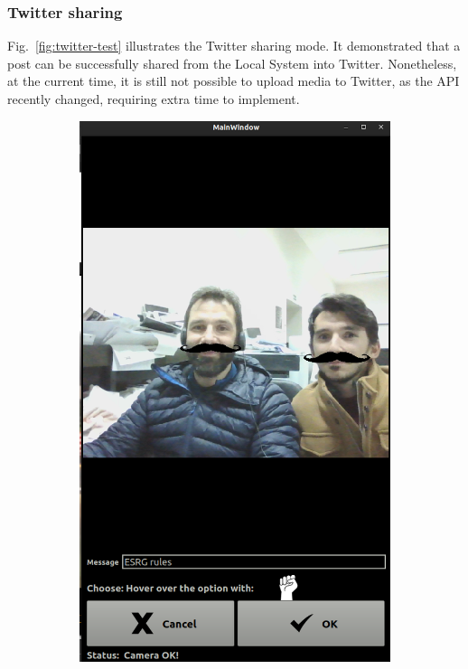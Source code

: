\subsubsection{Twitter sharing}
\label{sec:twitter-sharing}
Fig.~\ref{fig:twitter-test} illustrates the Twitter sharing mode. It
demonstrated that a post can be successfully shared from the Local System into
Twitter. Nonetheless, at the current time, it is still not possible to upload
media to Twitter, as the API recently changed, requiring extra time to implement.
%
\begin{figure}[htb!]
  \centering
  \begin{subfigure}[t]{.4\textwidth}
  \includegraphics[width=\textwidth]{img/ui-test-sharing-mode.png}%

\end{subfigure}
\end{figure}
